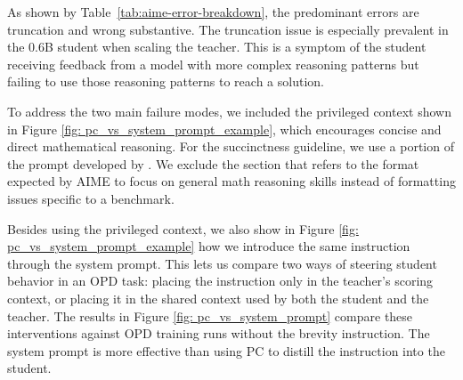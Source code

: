 As shown by Table~\ref{tab:aime-error-breakdown}, the predominant errors are truncation and wrong substantive. The truncation issue is especially prevalent in the 0.6B student when scaling the teacher. This is a symptom of the student receiving feedback from a model with more complex reasoning patterns but failing to use those reasoning patterns to reach a solution.

\begin{table}[ht]
  \centering
  \caption{Share of incorrect attempts (\% of incorrect) per error category in AIME25.}
  \label{tab:aime-error-breakdown}
\end{table}

To address the two main failure modes, we included the privileged context shown in Figure \ref{fig: pc_vs_system_prompt_example}, which encourages concise and direct mathematical reasoning. For the succinctness guideline, we use a portion of the prompt developed by \citet{sang2026CRISPCompressedReasoning}. We exclude the section that refers to the format expected by AIME to focus on general math reasoning skills instead of formatting issues specific to a benchmark.

Besides using the privileged context, we also show in Figure \ref{fig: pc_vs_system_prompt_example} how we introduce the same instruction through the system prompt. This lets us compare two ways of steering student behavior in an OPD task: placing the instruction only in the teacher's scoring context, or placing it in the shared context used by both the student and the teacher. The results in Figure \ref{fig: pc_vs_system_prompt} compare these interventions against OPD training runs without the brevity instruction. The system prompt is more effective than using PC to distill the instruction into the student.

